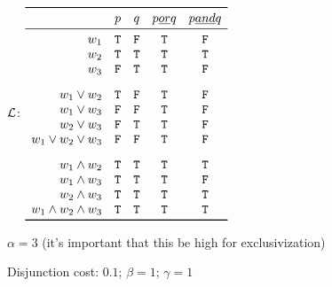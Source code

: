 \documentclass{article}
\begin{document}
\begin{examples}
\item 
  \begin{examples}
  \item 
    $\mathcal{L}$:
    $\begin{array}[c]{r *{4}{c}}
      \toprule
                    & p      & q      & p \word{ or } q & p \word{ and } q \\
      \midrule
      w_{1}          & \True    & \False & \True     & \False \\
      w_{2}          & \True   & \True  & \True     & \True  \\
      w_{3}          & \False  & \True  & \True     & \False 
      \\[2ex]
      w_{1} \vee w_{2} & \True & \False & \True & \False \\
      w_{1} \vee w_{3} & \False & \False & \True  & \False \\ 
      w_{2} \vee w_{3} & \False & \True & \True  & \False \\
      w_{1} \vee w_{2} \vee w_{3} & \False & \False & \True  & \False 
      \\[2ex]
      w_{1} \wedge w_{2}  & \True  & \True & \True & \True\\
      w_{1} \wedge w_{3}  & \True  & \True & \True & \False\\
      w_{2} \wedge w_{3}  & \True  & \True & \True & \True\\
      w_{1} \wedge w_{2} \wedge w_{3} & \True  & \True & \True & \True\\
      \bottomrule
    \end{array}$
  \item $\alpha = 3$ (it's important that this be high for exclusivization)
  \item Disjunction cost: $0.1$; $\beta = 1$; $\gamma = 1$  
  \end{examples}
\end{examples}
\end{document}
